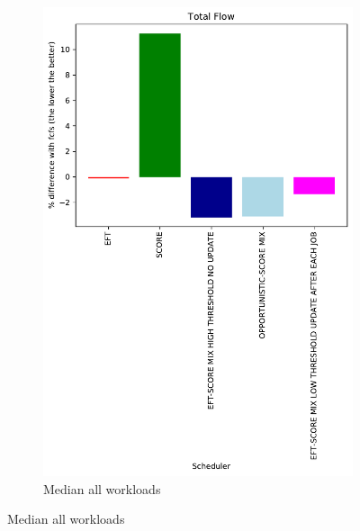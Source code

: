 \documentclass[a4paper]{article}
\begin{document}
\begin{figure}[H]
\begin{subfigure}[b]{0.4\linewidth}\centering\includegraphics[width=1\linewidth]{MBSS/plot/Results_Percentage_FCFS_All_workloads_mediane_Total_Flow_450_128_32_256_4_1024.pdf}\caption{Median all workloads}\end{subfigure}

\end{figure}
\end{document}
